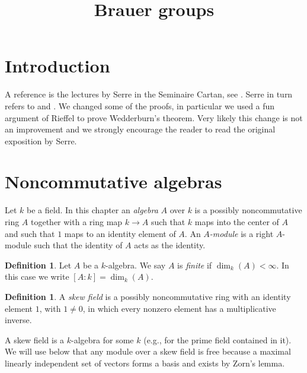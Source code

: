 \documentclass{stacks-project}
\theoremstyle{plain}
\theoremstyle{definition}
\newtheorem{definition}[subsection]{Definition}
\theoremstyle{remark}
\numberwithin{equation}{subsection}
\begin{document}
\title{Brauer groups}


\maketitle

\label{section-phantom}

\tableofcontents

\section{Introduction}
\label{section-introduction}

\noindent
A reference is the lectures by Serre in the Seminaire Cartan, see
\cite{Serre-Cartan}. Serre in turn refers to
\cite{Deuring} and \cite{ANT}. We changed some of the proofs, in particular
we used a fun argument of Rieffel to prove Wedderburn's theorem.
Very likely this change is not an improvement and we strongly
encourage the reader to read the original exposition by Serre.


\section{Noncommutative algebras}
\label{section-algebras}

\noindent
Let $k$ be a field. In this chapter an {\it algebra} $A$ over $k$ is
a possibly noncommutative ring $A$ together with a ring map
$k \to A$ such that $k$ maps into the center of $A$ and such that
$1$ maps to an identity element of $A$. An {\it $A$-module} is a right
$A$-module such that the identity of $A$ acts as the identity.

\begin{definition}
\label{definition-finite}
Let $A$ be a $k$-algebra. We say $A$ is {\it finite} if $\dim_k(A) < \infty$.
In this case we write $[A : k] = \dim_k(A)$.
\end{definition}

\begin{definition}
\label{definition-skew-field}
A {\it skew field} is a possibly noncommutative ring with an identity
element $1$, with $1 \not = 0$, in which every nonzero element
has a multiplicative inverse.
\end{definition}

\noindent
A skew field is a $k$-algebra for some $k$ (e.g., for the prime field
contained in it). We will use below that any module over a skew field
is free because a maximal linearly independent set of vectors forms a
basis and exists by Zorn's lemma.
\end{document}
